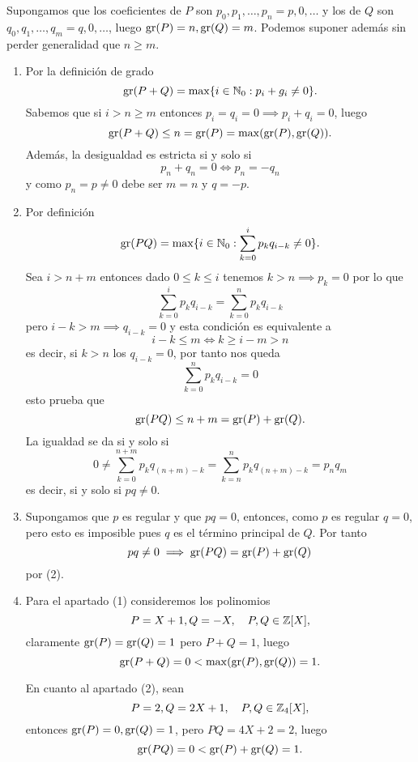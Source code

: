 \begin{proofbox}

Supongamos que los coeficientes de $P$ son \(p_0, p_1, \dots, p_n = p, 0, \dots\) y los de $Q$ son $q_0, q_1, \dots, q_m = q, 0, \dots$, luego $\operatorname{gr}(P) = n, \operatorname{gr}(Q) = m$. Podemos suponer además sin perder generalidad que $n \geq m$.

\begin{enumerate}
    \item Por la definición de grado
    \[
    \operatorname{gr}(P + Q) = \max \{i \in \mathbb{N}_0 : p_i + g_i \neq 0\}.
    \]
    Sabemos que si $i > n \geq m$ entonces $p_i = q_i = 0 \implies p_i + q_i = 0$, luego
    \[
    \operatorname{gr}(P + Q) \leq n = \operatorname{gr}(P) = \max(\operatorname{gr}(P), \operatorname{gr}(Q)).
    \] 
    Además, la desigualdad es estricta si y solo si 
    \[
    p_n + q_n = 0 \iff p_n = -q_n 
    \]
    y como $p_n = p \neq 0$ debe ser $m = n$ y $q = -p$.
    \item Por definición
    \[
    \operatorname{gr}(PQ) = \max \{i \in \mathbb{N}_0 : \sum_{k=0}^{i} p_kq_{i - k} \neq 0\}.
    \]
    Sea $i > n + m$ entonces dado $0 \leq k \leq i$ tenemos \(k > n \implies p_k = 0\) por lo que 
    \[
    \sum_{k=0}^{i} p_kq_{i - k} = \sum_{k=0}^{n} p_kq_{i - k}
    \]
    pero $i - k > m \implies q_{i-k} = 0$ y esta condición es equivalente a
    \[
    i - k \leq m \iff k \geq i - m > n
    \]
    es decir, si $k > n$ los $q_{i-k} = 0$, por tanto nos queda
    \[
    \sum_{k=0}^{n} p_kq_{i - k} = 0
    \]
    esto prueba que 
    \[
    \operatorname{gr}(PQ) \leq n + m = \operatorname{gr}(P) + \operatorname{gr}(Q).
    \]
    La igualdad se da si y solo si
    \[
    0 \neq \sum_{k=0}^{n + m} p_kq_{(n+m) - k} = \sum_{k=n}^{n} p_k q_{(n+m) - k} = p_n q_m 
    \]
    es decir, si y solo si \(pq \neq 0\).
    \item Supongamos que \(p\) es regular y que \(pq = 0\), entonces, como $p$ es regular \(q = 0\), pero esto es imposible pues \(q\) es el término principal de \(Q\). Por tanto
    \[
    pq \neq 0 \implies \operatorname{gr}(PQ) = \operatorname{gr}(P) + \operatorname{gr}(Q)
    \]
    por (2).
    \item Para el apartado (1) consideremos los polinomios
    \[
    P = X + 1, Q = -X,\quad P,Q \in \mathbb{Z}[X],
    \]
    claramente $\operatorname{gr}(P) = \operatorname{gr}(Q) = 1$ pero \(P + Q = 1\), luego
    \[
    \operatorname{gr}(P + Q) = 0 < \max(\operatorname{gr}(P), \operatorname{gr}(Q)) = 1.
    \]

    En cuanto al apartado (2), sean
    \[
    P = 2, Q = 2X + 1,\quad P,Q \in \mathbb{Z}_4[X],
    \]
    entonces $\operatorname{gr}(P) = 0, \operatorname{gr}(Q) = 1$, pero $PQ = 4X + 2 = 2$, luego 
    \[
    \operatorname{gr}(PQ) = 0 < \operatorname{gr}(P) + \operatorname{gr}(Q) = 1.
    \]
\end{enumerate}

\end{proofbox}

